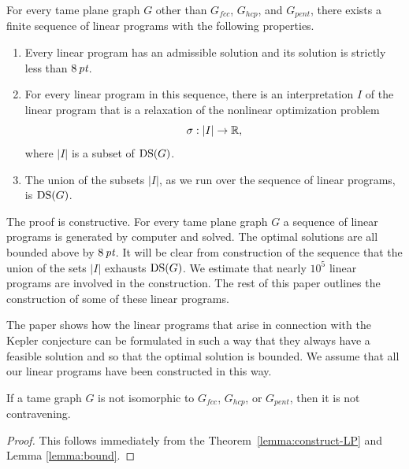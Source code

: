 \begin{theorem}\label{lemma:construct-LP}
For every tame plane graph $G$ other than
$G_{fcc}$, $G_{hcp}$, and $G_{pent}$,
there exists a finite sequence of linear programs with the
following properties.
    \begin{enumerate}
    \item Every linear program has an admissible solution and its solution is strictly
        less than $8\,\hbox{\it pt}$.
    \item For every linear program in this sequence,
        there is an interpretation $I$ of the linear program that is a
        relaxation of the nonlinear optimization problem
    $$\sigma:|I|\to {\mathbb R},$$
        where $|I|$ is a subset of ${\operatorname{DS}}(G)$.
    \item The union of the subsets $|I|$,
        as we run over the sequence of linear programs, is ${\operatorname{DS}}(G)$.
    \end{enumerate}
\end{theorem}

The proof is constructive.  For every tame plane graph $G$ a
sequence of linear programs is generated by computer and solved.
The optimal solutions are all bounded above by $8\,\hbox{\it pt}$. It will
be clear from construction of the sequence that the union of the
sets $|I|$ exhausts ${\operatorname{DS}}(G)$.  We estimate that nearly $10^5$
linear programs are involved in the construction.  The rest of
this paper outlines the construction of some of these linear
programs.  

\begin{remark} The paper \cite[Section~3.1.1]{algorithm} shows how the
linear programs that arise in connection with the Kepler conjecture
can be formulated in such a way that they always have a feasible
solution and so that the optimal solution is bounded.  We assume
that all our linear programs have been constructed in this way.
\end{remark}


\begin{corollary} If a tame graph $G$ is not isomorphic to
$G_{fcc}$, $G_{hcp}$,
or $G_{pent}$, then it is not
contravening.
\end{corollary}

\begin{proof}
This follows immediately from the Theorem~\ref{lemma:construct-LP} and
Lemma \ref{lemma:bound}.
\end{proof}

